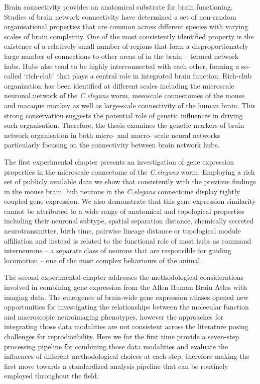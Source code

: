 
\vspace*{20mm}

\vspace{10mm}

Brain connectivity provides an anatomical substrate for brain functioning. Studies of brain network connectivity have determined a set of non-random organisational properties that are common across different species with varying scales of brain complexity. One of the most consistently identified property is the existence of a relatively small number of regions that form a disproportionately large number of connections to other areas of in the brain -- termed network hubs. Hubs also tend to be highly interconnected with each other, forming a so-called `rich-club' that plays a central role in integrated brain function. Rich-club organization has been identified at different scales including the microscale neuronal network of the \textit{C.elegans} worm, mesoscale connectomes of the mouse and macaque monkey as well as large-scale connectivity of the human brain. This strong conservation suggests the potential role of genetic influences in driving such organisation. Therefore, the thesis examines the genetic markers of brain network organisation in both micro- and macro- scale neural networks particularly focusing on the connectivity between brain network hubs. 

The first experimental chapter presents an investigation of gene expression properties in the microscale connectome of the \textit{C.elegans} worm. Employing a rich set of publicly available data we show that consistently with the previous findings in the mouse brain, hub neurons in the \textit{C.elegans} connectome display tightly coupled gene expression. We also demonstrate that this gene expression similarity cannot be attributed to a wide range of anatomical and topological properties including their neuronal subtype, spatial separation distance, chemically secreted neurotransmitter, birth time, pairwise lineage distance or topological module affiliation and instead is related to the functional role of most hubs as command interneurons -- a separate class of neurons that are responsible for guiding locomotion -- one of the most complex behaviours of the animal. 

The second experimental chapter addresses the methodological considerations involved in combining gene expression from the Allen Human Brain Atlas with imaging data. The emergence of brain-wide gene expression atlases opened new opportunities for investigating the relationships between the molecular function and macroscopic neuroimaging phenotypes, however the approaches for integrating those data modalities are not consistent across the literature posing challenges for reproducibility. Here we for the first time provide a seven-step processing pipeline for combining those data modalities and evaluate the influences of different methodological choices at each step, therefore making the first move towards a standardized analysis pipeline that can be routinely employed throughout the field. 


